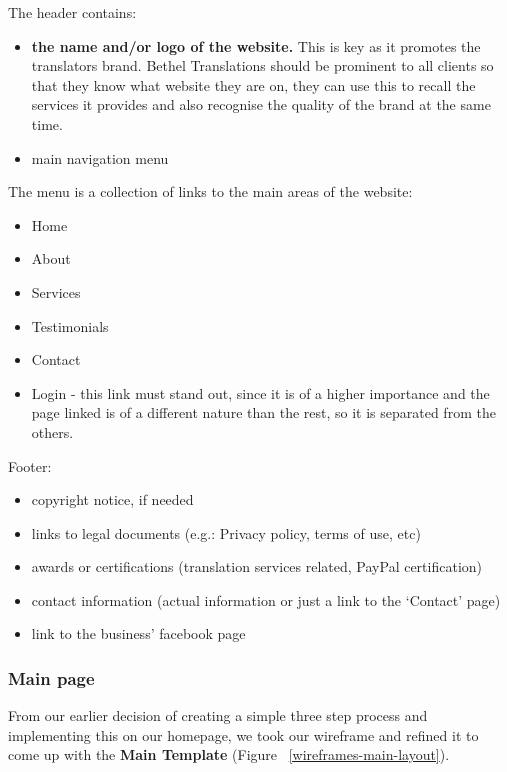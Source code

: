 \documentclass{l3proj}
\begin{document}
The header contains:
\begin{itemize} \itemsep1pt \parskip0pt 
	\item \textbf{the name and/or logo of the website.} This is key as it promotes the translators brand. Bethel Translations should be prominent to all clients so that they know what website they are on, they can use this to recall the services it provides and also recognise the quality of the brand at the same time. 
	\item main navigation menu
\end{itemize}

The menu is a collection of links to the main areas of the website:
\begin{itemize} \itemsep1pt \parskip0pt 
	\item Home
	\item About
	\item Services
	\item Testimonials
	\item Contact
	\item Login - this link must stand out, since it is of a higher
	importance and the page linked is of a different nature than the rest,
	so it is separated from the others.
\end{itemize}


Footer:
\begin{itemize} \itemsep1pt \parskip0pt 
	\item copyright notice, if needed
	\item links to legal documents (e.g.: Privacy policy, terms of use, etc)
	\item awards or certifications (translation services related, 
	PayPal certification)
	\item contact information (actual information or just a link to the 
	`Contact’ page)
	\item link to the business’ facebook page
\end{itemize}


\subsubsection{Main page}
From our earlier decision of creating a simple three step process and
implementing this on our homepage, we took our wireframe and refined it to
come up with the  \textbf{Main Template} (Figure ~\ref{wireframes-main-layout}).
\end{document}
